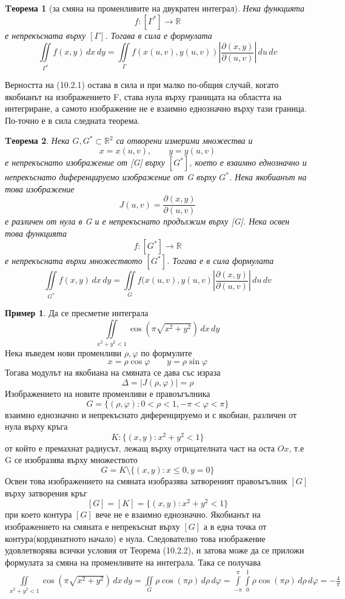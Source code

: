 \documentclass[a4paper,fleqn,12pt]{article}
\newtheorem{theorem}{Tеорема}[subsection]
\theoremstyle{definition}
\newtheorem{example}{Пример}[subsection]
\begin{document}
\begin{theorem}[за смяна на променливите на двукратен интеграл]
Нека функцията 
$$f: [\Gamma^*] \to \mathbb{R}$$
е непрекъсната върху $[\Gamma]$. Тогава в сила е формулата
$$\iint\limits_{\Gamma^*} f(x,y) \, dx \, dy = \iint\limits_{\Gamma} f(x(u,v),y(u,v)) \left| \frac{\partial (x,y)}{\partial (u,v)} \right| \, du \, dv$$
\end{theorem}
Верността на (10.2.1) остава в сила и при малко по-общия случай, когато якобианът на изображението F, става нула върху границата на областта на интегриране, а самото изображение не е взаимно еднозначно върху тази граница. По-точно е в сила следната теорема.
\begin{theorem}
Нека $G,G^* \subset \mathbb{R}^2$ са отворени измерими множества и 
$$x = x(u,v), \qquad y = y(u,v)$$
е непрекъснато изображение от [G] върху $[G^*]$, което е взаимно еднозначно и непрекъснато диференцируемо изображение от G върху $G^*$. Нека якобианът на това изображение
$$J(u,v) = \frac{\partial (x,y)}{\partial (u,v)}$$
е различен от нула в G и е непрекъснато продължим върху [G]. Нека освен това функцията 
$$f: [G^*] \to \mathbb{R}$$
е непрекъсната върхи множеството $[G^*]$. Тогава е в сила формулата
$$\iint\limits_{G^*} f(x,y) \, dx \, dy = \iint\limits_{G} f(x(u,v),y(u,v) \left| \frac{\partial (x,y)}{\partial (u,v)} \right| \, du \, dv$$
\end{theorem}

\begin{example}
Да се пресметне интеграла
$$\iint\limits_{x^2+y^2 < 1} \cos (\pi \sqrt{x^2 + y^2}) \, dx \, dy$$
Нека въведем нови променливи $\rho, \varphi$ по формулите
$$x = \rho \cos \varphi \qquad y = \rho \sin \varphi $$
Тогава модулът на якобиана на смяната се дава със израза 
$$\Delta = |J(\rho, \varphi)| = \rho$$
Изображението на новите променливи е правоъгълника
$$G = \{ (\rho, \varphi): 0 < \rho < 1, -\pi < \varphi < \pi \}$$
взаимно еднозначно и непрекъснато диференцируемо и с якобиан, различен от нула върху кръга
$$K: \{ (x,y):x^2 + y^2 < 1 \}$$
от който е премахнат радиусът, лежащ върху отрицателната част на оста $Ox$, т.е G се изобразява върху множеството
$$G = K \setminus \{ (x,y) : x \leq 0, y=0\}$$
Освен това изображението на смяната изобразява затвореният правоъгълник $[G]$ върху затворения кръг
$$[G] = [K] = \{ (x,y): x^2 + y^2 < 1 \}$$
при което контура $[G]$ вече не е взаимно еднозначно. Якобианът на изображението на смяната е непрекъснат върху $[G]$ а в една точка от контура(кординатното начало) е нула. Следователно това изображение удовлетворява всички условия от Теорема (10.2.2), и затова може да се приложи формулата за смяна на променливите на интеграла. Така се получава
\begin{gather*}
\iint\limits_{x^2+y^2 < 1} \cos (\pi \sqrt{x^2 + y^2}) \, dx \, dy = \iint\limits_{G} \rho \cos(\pi \rho) \, d\rho \, d \varphi = \int\limits_{-\pi} ^{\pi}  \int\limits_0 ^1 \rho \cos(\pi \rho) \, d\rho \, d\varphi= - \frac{4}{\pi}
\end{gather*}
\end{example}
\end{document}
